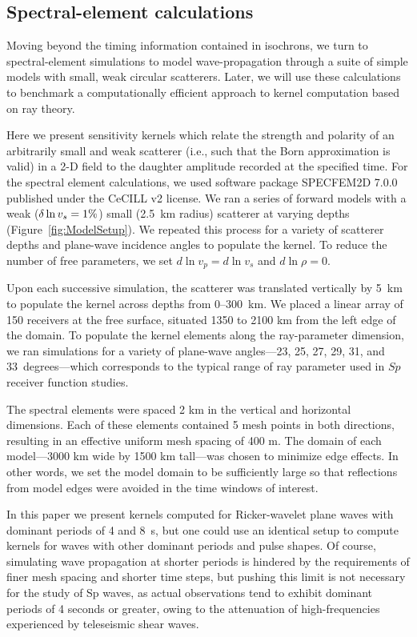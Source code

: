 \documentclass[referee]{gji}
\begin{document}
\subsection{Spectral-element calculations}

Moving beyond the timing information contained in isochrons, we turn to spectral-element simulations to model wave-propagation through a suite of simple models with small, weak circular scatterers.  Later, we will use these calculations to benchmark a computationally efficient approach to kernel computation based on ray theory. 

Here we present sensitivity kernels which relate the strength and polarity of an arbitrarily small and weak scatterer (i.e., such that the Born approximation is valid) in a 2-D field to the daughter amplitude recorded at the specified time.  For the spectral element calculations, we used software package SPECFEM2D 7.0.0 \citep{Tromp2008, specfem2dsoftware} published under the CeCILL v2 license.  We ran a series of forward models with a weak ($\delta \ln v_s = 1\%$) small (2.5~km radius) scatterer at varying depths (Figure~\ref{fig:ModelSetup}).  We repeated this process for a variety of scatterer depths and plane-wave incidence angles to populate the kernel.  To reduce the number of free parameters, we set $d\ln v_p=d\ln v_s$ and $d\ln \rho =0$.

Upon each successive simulation, the scatterer was translated vertically by 5~km to populate the kernel across depths from 0--300~km. We placed a linear array of 150 receivers at the free surface, situated 1350 to 2100 km from the left edge of the domain.  To populate the kernel elements along the ray-parameter dimension, we ran simulations for a variety of plane-wave angles---23, 25, 27, 29, 31, and 33~degrees---which corresponds to the typical range of ray parameter used in $Sp$ receiver function studies.

The spectral elements were spaced 2 km in the vertical and horizontal dimensions.  Each of these elements contained 5 mesh points in both directions, resulting in an effective uniform mesh spacing of 400 m.  The domain of each model---3000 km wide by 1500 km tall---was chosen to minimize edge effects.  In other words, we set the model domain to be sufficiently large so that reflections from model edges were avoided in the time windows of interest.

In this paper we present kernels computed for Ricker-wavelet plane waves with dominant periods of 4 and 8~s, but one could use an identical setup to compute kernels for waves with other dominant periods and pulse shapes.  Of course, simulating wave propagation at shorter periods is hindered by the requirements of finer mesh spacing and shorter time steps, but pushing this limit is not necessary for the study of Sp waves, as actual observations tend to exhibit dominant periods of 4 seconds or greater, owing to the attenuation of high-frequencies experienced by teleseismic shear waves.
\end{document}
